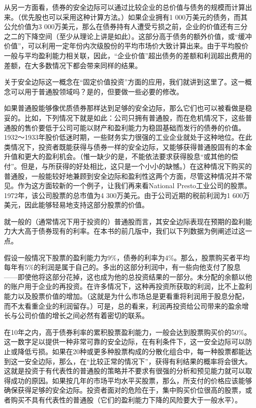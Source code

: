 \documentclass[12pt,oneside]{book}
\begin{document}
从另一方面看，债券的安全边际可以通过比较企业的总价值与债务的规模而计算出来。（优先股也可以采用这种计算方法。）如果企业拥有1 000万美元的债务，而其公允价值为3 000万美元，那么在债券持有人遭受亏损之前，企业的价值还有三分之二的下降空间（至少从理论上讲是如此）。这部分高于债务的额外价值，或“缓冲价值”，可以利用一定年份内次级股份的平均市场价大致计算出来。由于平均股价一般与平均盈利能力相关联，因此，“企业价值”超出债务的差额和利润超出费用的差额，在大多数情况下都会带来同样的结果。

关于安全边际这一概念在“固定价值投资”方面的应用，我们就讲到这里了。这一概念可以用于普通股领域吗？是的，但要做一些必要的修改。

如果普通股能够像优质债券那样达到足够的安全边际，那么它们也可以被看做是稳妥的。比如，下列情况下就是如此：公司只拥有普通股，而在危机情况下，这些普通股的售价要低于公司可能以财产和盈利能力为稳固基础而发行的债券的价值。1932～1933年股价低迷时期，一些财务实力很强的工业企业就处于这种地位。在此类情况下，投资者既能获得与债券一样的安全边际，又能够获得普通股固有的本金升值和更大的盈利机会。（惟一缺少的是，不能依法要求获得股息“或其他的偿付”。但是，与所获得的好处相比，这只是一个小小的缺憾。）在这种情况下购买的普通股，一般能较好地兼顾到安全边际和盈利性这两个方面，尽管这种情况并不常见。作为这方面较新的一个例子，让我们再来看National Presto工业公司的股票。1972年，该公司股票的总市值为4 300万美元。由于公司近期的税前利润为1 600万美元，因此能够轻易地支持这部分股票的价值。

就一般的（通常情况下用于投资的）普通股而言，其安全边际表现在预期的盈利能力大大高于债券现有的利率。在本书的前几版中，我们以下列数据为例阐述过这一点。

假设一般情况下股票的盈利能力为9\%，债券的利率为4\%。那么，股票购买者平均每年有5\%的利润是属于自己的。多出的这部分利润中，有一些向他支付了股息——即使他将这部分花掉，这也成为他的总投资结果的一部分。未分配的余额以他的账户用于企业的再投资。在许多情况下，这种再投资所获取的利润，比不上盈利能力以及股票价值的增加。（这就是为什么市场总是更看重将利润用于股息分配，而不太看重企业的利润留存。）可是，总的看来，利润再投资给公司带来的盈余增长与公司价值的增长之间必然有着密切的联系。

在10年之内，高于债券利率的累积股票盈利能力，一般会达到股票购买价的50\%。这一数字足以提供一种非常可靠的安全边际，在有利条件下，这一安全边际可以防止或降低亏损。如果在20种或更多种股票构成的分散化组合中，每一种股票都能达到这一安全边际，那么，在“比较正常的情况下”，获得有利结果的概率将会很大。这就是投资于有代表性的普通股的策略并不要求有很强的分析和预见能力就可以取得成功的原因。如果按几年的市场平均水平买股票，那么，所支付的价格应该能够确保获得足够的安全边际。投资者面对的危险在于，集中购买价位很高的股票，或者购买不具有代表性的普通股（它们的盈利能力下降的风险要大于一般水平）。
\end{document}

